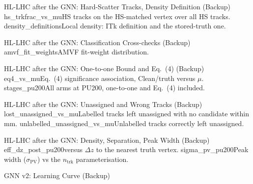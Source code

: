 \begin{frame}{HL-LHC after the GNN: Hard-Scatter Tracks, Density Definition (Backup)}
\backupbadge
{}%
{hs_trkfrac_vs_mu}{HS tracks on the HS-matched vertex over all HS tracks.}%
{density_definitions}{Local density: ITk definition and the stored-truth one.}
\end{frame}

\begin{frame}{HL-LHC after the GNN: Classification Cross-checks (Backup)}
\backupbadge
{}%
{amvf_fit_weights}{AMVF fit-weight distribution.}
\par{}
\end{frame}

\begin{frame}{HL-LHC after the GNN: One-to-one Bound and Eq.~(4) (Backup)}
\backupbadge
{}%
{eq4_vs_mu}{Eq.~(4) significance association, Clean/truth versus $\mu$.}%
{stages_pu200}{All arms at PU200, one-to-one and Eq.~(4) included.}
\end{frame}

\begin{frame}{HL-LHC after the GNN: Unassigned and Wrong Tracks (Backup)}
\backupbadge
{}%
{lost_unassigned_vs_mu}{Labelled tracks left unassigned with no candidate within \winMM{} mm.}%
{unlabelled_unassigned_vs_mu}{Unlabelled tracks correctly left unassigned.}
\end{frame}

\begin{frame}{HL-LHC after the GNN: Density, Separation, Peak Width (Backup)}
\backupbadge
{}%
{eff_dz_post_pu200}{versus $\Delta z$ to the nearest truth vertex.}%
{sigma_pv_pu200}{Peak width ($\sigma_\mathrm{PV}$) vs the $n_\mathrm{trk}$ parameterisation.}
\end{frame}

\begin{frame}{GNN v2: Learning Curve (Backup)}
\backupbadge
\begin{center}\end{center}
\end{frame}


